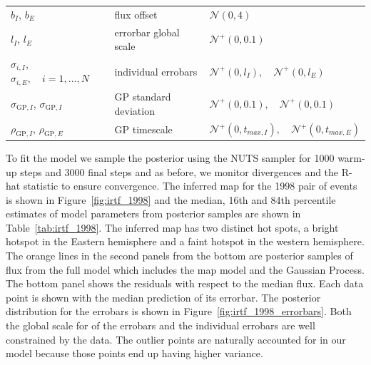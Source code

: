 \documentclass[linenumbers,modern]{aastex62}
\begin{document}
\begin{table}[t!]
\begin{center}
\begin{longtable}{W{l}{4cm} W{l}{4cm} W{l}{6cm}}
            \\
    $b_I$, $b_E$& flux offset &$\mathcal{N}(0, 4)$
            \\
            $l_I$, $l_E$& errorbar global scale&$\mathcal{N}^+(0,0.1)$
            \\
            $\sigma_{i,I}$, $\sigma_{i,E},\quad i=1,\dots,N$& individual errobars&
            $\mathcal{N}^+(0,l_I),\quad \mathcal{N}^+(0,l_E)$
            \\
            $\sigma_{\mathrm{GP}, I}$, $\sigma_{\mathrm{GP}, I}$ & GP standard deviation&$\mathcal{N}^+(0,0.1),\quad \mathcal{N}^+(0,0.1)$
            \\
            $\rho_{\mathrm{GP},I}$, $\rho_{\mathrm{GP},E}$ & GP timescale  & $\mathcal{N}^+(0, t_{max, I}),\quad  \mathcal{N}^+(0, t_{max, E})$
        \\
        \end{longtable}
    \end{center}
\end{table}

To fit the model we sample the posterior using the NUTS sampler for 1000 warm-up steps and 3000 final steps and as before, we monitor divergences and the R-hat statistic to ensure convergence.
The inferred map for the 1998 pair of events is shown in Figure~\ref{fig:irtf_1998} and the median, 16th and 84th percentile estimates of model parameters from posterior samples are shown in Table~\ref{tab:irtf_1998}. 
The inferred map has two distinct hot spots, a bright hotspot in the Eastern hemisphere and a faint hotspot in the western hemisphere.
The orange lines in the second panels from the bottom are posterior samples of flux from the full model which includes the map model and the Gaussian Process.
The bottom panel shows the residuals with respect to the median flux.
Each data point is shown with the median prediction of its errorbar.
The posterior distribution for the errobars is shown in Figure~\ref{fig:irtf_1998_errorbars}.
Both the global scale for of the errobars and the individual errobars are well constrained by the data. 
The outlier points are naturally accounted for in our model because those points end up having higher variance.
\end{document}
